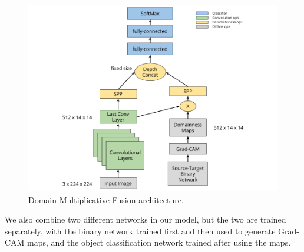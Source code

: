 \documentclass[../main.tex]{subfiles}
\begin{document}
    \begin{figure}[h!]
        \centering{}
        \includegraphics[width=\linewidth]{./img/dmf-architecture.png}
        \caption{Domain-Multiplicative Fusion architecture.}\label{fig:dmf-architecture}
    \end{figure}

    \newline
    We also combine two different networks in our model, but the two are trained separately, with the binary
    network trained first and then used to generate Grad-CAM maps, and the object classification network trained after using the maps.
\end{document}
